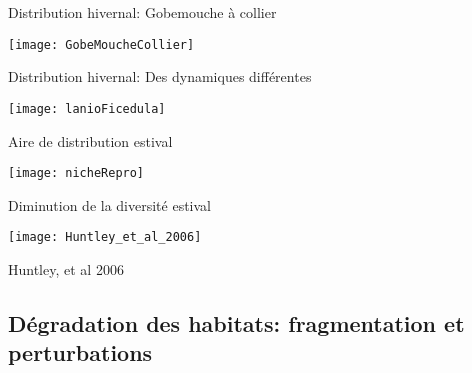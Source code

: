\documentclass[10pt]{beamer}
\begin{document}
\begin{frame}{Distribution hivernal: Gobemouche à collier}
  \begin{center}
   \texttt{[image: GobeMoucheCollier]}
  \end{center}
\end{frame}

\begin{frame}{Distribution hivernal: Des dynamiques différentes}
  \begin{center}
   \texttt{[image: lanioFicedula]}
  \end{center}
\end{frame}

\begin{frame}{Aire de distribution estival}
  \begin{center}
   \texttt{[image: nicheRepro]}
  \end{center}

\end{frame}

\begin{frame}{Diminution de la diversité estival}
  \begin{center}
   \texttt{[image: Huntley\_et\_al\_2006]}
  \end{center}
  \begin{tiny}
   Huntley, et al 2006
  \end{tiny}

\end{frame}



\subsection{Dégradation des habitats: fragmentation et perturbations}
\end{document}
